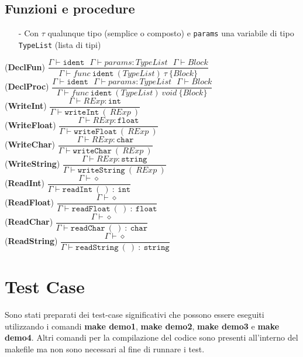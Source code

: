 \documentclass[12pt]{article}
\begin{document}
\subsection*{Funzioni e procedure}
\begin{center}
\begin{itemize}
\item[-] Con $\tau$ qualunque tipo (semplice o composto) e \texttt{params} una variabile di tipo \texttt{TypeList} (lista di tipi)
\end{itemize}
\noindent(\textbf{DeclFun})
$\dfrac{\Gamma \vdash \texttt{ident}\ \ \ \Gamma \vdash params:TypeList\ \ \ \Gamma \vdash Block}{\Gamma \vdash func\ \texttt{ident}\ (TypeList)\ \tau\ \{Block\}}$\\[0.1in]
\noindent(\textbf{DeclProc})
$\dfrac{\Gamma \vdash \texttt{ident}\ \ \ \Gamma \vdash params:TypeList\ \ \ \Gamma \vdash Block}{\Gamma \vdash func\ \texttt{ident}\ (TypeList)\ void\ \{Block\}}$\\[0.1in]

\noindent(\textbf{WriteInt})
$\dfrac{\Gamma \vdash RExp:\texttt{int}}{\Gamma \vdash \texttt{writeInt}\ (\ RExp\ )}$\\[0.1in]
\noindent(\textbf{WriteFloat})
$\dfrac{\Gamma \vdash RExp:\texttt{float}}{\Gamma \vdash \texttt{writeFloat}\ (\ RExp\ )}$\\[0.1in]
\noindent(\textbf{WriteChar})
$\dfrac{\Gamma \vdash RExp:\texttt{char}}{\Gamma \vdash \texttt{writeChar}\ (\ RExp\ )}$\\[0.1in]
\noindent(\textbf{WriteString})
$\dfrac{\Gamma \vdash RExp:\texttt{string}}{\Gamma \vdash \texttt{writeString}\ (\ RExp\ )}$\\[0.1in]
\noindent(\textbf{ReadInt})
$\dfrac{\Gamma \vdash \diamond}{\Gamma \vdash \texttt{readInt}\ (\ )\ :\ \texttt{int}}$\\[0.1in]
\noindent(\textbf{ReadFloat})
$\dfrac{\Gamma \vdash \diamond}{\Gamma \vdash \texttt{readFloat}\ (\ )\ :\ \texttt{float}}$\\[0.1in]
\noindent(\textbf{ReadChar})
$\dfrac{\Gamma \vdash \diamond}{\Gamma \vdash\texttt{readChar}\ (\ )\ :\ \texttt{char}}$\\[0.1in]
\noindent(\textbf{ReadString})
$\dfrac{\Gamma \vdash \diamond}{\Gamma \vdash \texttt{readString}\ (\ )\ :\ \texttt{string}}$\\[0.1in]
\end{center}


\pagebreak
\section*{Test Case}
Sono stati preparati dei test-case significativi che possono essere eseguiti utilizzando i comandi \textbf{make demo1}, \textbf{make demo2}, \textbf{make demo3} e \textbf{make demo4}. Altri comandi per la compilazione del codice sono presenti all'interno del makefile ma non sono necessari al fine di runnare i test.
\end{document}
